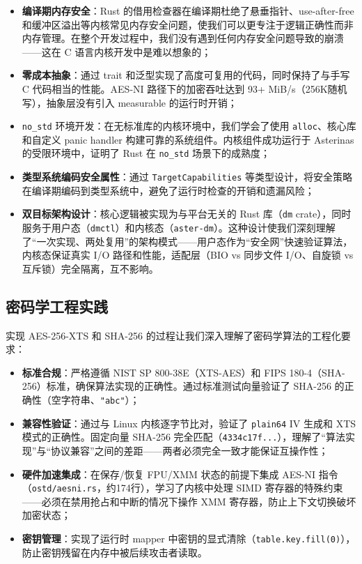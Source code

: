 \begin{itemize}
    \item \textbf{编译期内存安全}：Rust 的借用检查器在编译期杜绝了悬垂指针、use-after-free 和缓冲区溢出等内核常见内存安全问题，使我们可以更专注于逻辑正确性而非内存管理。在整个开发过程中，我们没有遇到任何内存安全问题导致的崩溃——这在 C 语言内核开发中是难以想象的；
    \item \textbf{零成本抽象}：通过 trait 和泛型实现了高度可复用的代码，同时保持了与手写 C 代码相当的性能。AES-NI 路径下的加密吞吐达到 93+ MiB/s（256K随机写），抽象层没有引入 measurable 的运行时开销；
    \item \texttt{no\_std} 环境开发：在无标准库的内核环境中，我们学会了使用 \texttt{alloc}、核心库和自定义 panic handler 构建可靠的系统组件。内核组件成功运行于 Asterinas 的受限环境中，证明了 Rust 在 \texttt{no\_std} 场景下的成熟度；
    \item \textbf{类型系统编码安全属性}：通过 \texttt{TargetCapabilities} 等类型设计，将安全策略在编译期编码到类型系统中，避免了运行时检查的开销和遗漏风险；
    \item \textbf{双目标架构设计}：核心逻辑被实现为与平台无关的 Rust 库（\texttt{dm} crate），同时服务于用户态（\texttt{dmctl}）和内核态（\texttt{aster-dm}）。这种设计使我们深刻理解了“一次实现、两处复用”的架构模式——用户态作为“安全网”快速验证算法，内核态保证真实 I/O 路径和性能，适配层（BIO vs 同步文件 I/O、自旋锁 vs 互斥锁）完全隔离，互不影响。
\end{itemize}

\subsection{密码学工程实践}

实现 AES-256-XTS 和 SHA-256 的过程让我们深入理解了密码学算法的工程化要求：

\begin{itemize}
    \item \textbf{标准合规}：严格遵循 NIST SP 800-38E（XTS-AES）和 FIPS 180-4（SHA-256）标准，确保算法实现的正确性。通过标准测试向量验证了 SHA-256 的正确性（空字符串、\texttt{"abc"}）；
    \item \textbf{兼容性验证}：通过与 Linux 内核逐字节比对，验证了 \texttt{plain64} IV 生成和 XTS 模式的正确性。固定向量 SHA-256 完全匹配（\texttt{4334c17f...}），理解了“算法实现”与“协议兼容”之间的差距——两者必须完全一致才能保证互操作性；
    \item \textbf{硬件加速集成}：在保存/恢复 FPU/XMM 状态的前提下集成 AES-NI 指令（\texttt{ostd/aesni.rs}，约174行），学习了内核中处理 SIMD 寄存器的特殊约束——必须在禁用抢占和中断的情况下操作 XMM 寄存器，防止上下文切换破坏加密状态；
    \item \textbf{密钥管理}：实现了运行时 mapper 中密钥的显式清除（\texttt{table.key.fill(0)}），防止密钥残留在内存中被后续攻击者读取。
\end{itemize}

